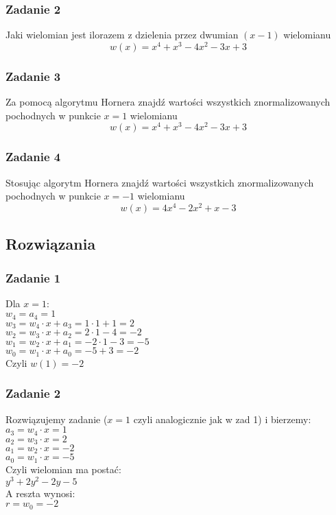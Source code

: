 \documentclass[a4paper]{article}
\begin{document}
\subsubsection*{Zadanie 2}
Jaki wielomian jest ilorazem z dzielenia przez dwumian $(x-1)$ wielomianu
$$w(x)=x^4+x^3-4x^2-3x+3$$

\subsubsection*{Zadanie 3}
Za pomocą algorytmu Hornera znajdź wartości wszystkich znormalizowanych pochodnych w punkcie $x = 1$ wielomianu
$$w(x)=x^4+x^3-4x^2-3x+3$$

\subsubsection*{Zadanie 4}
Stosując algorytm Hornera znajdź wartości wszystkich znormalizowanych pochodnych w punkcie $x = -1$ wielomianu
$$w(x)=4x^4-2x^2+x-3$$

\subsection{Rozwiązania}
\subsubsection*{Zadanie 1}
Dla $x=1$:\\
$w_4 = a_4 = 1$ \\
$w_3 = w_4\cdot x + a_3 = 1 \cdot 1 + 1 = 2 $ \\ 
$w_2 = w_3\cdot x + a_2 = 2 \cdot 1 - 4 = -2 $ \\
$w_1 = w_2\cdot x + a_1 = -2 \cdot 1 - 3 = -5$ \\
$w_0 = w_1\cdot x + a_0 = -5+3 = -2$ \\
Czyli $w(1) = -2$
\subsubsection*{Zadanie 2}
Rozwiązujemy zadanie ($x=1$ czyli analogicznie jak w zad 1) i bierzemy:\\
$a_3 = w_4 \cdot x = 1$\\
$a_2 = w_3 \cdot x = 2$\\
$a_1 = w_2 \cdot x = -2$\\
$a_0 = w_1 \cdot x = -5$\\
Czyli wielomian ma postać:\\
$y^3+2y^2-2y-5$ \\
A reszta wynosi: \\
$r = w_0 = -2 $
\end{document}
